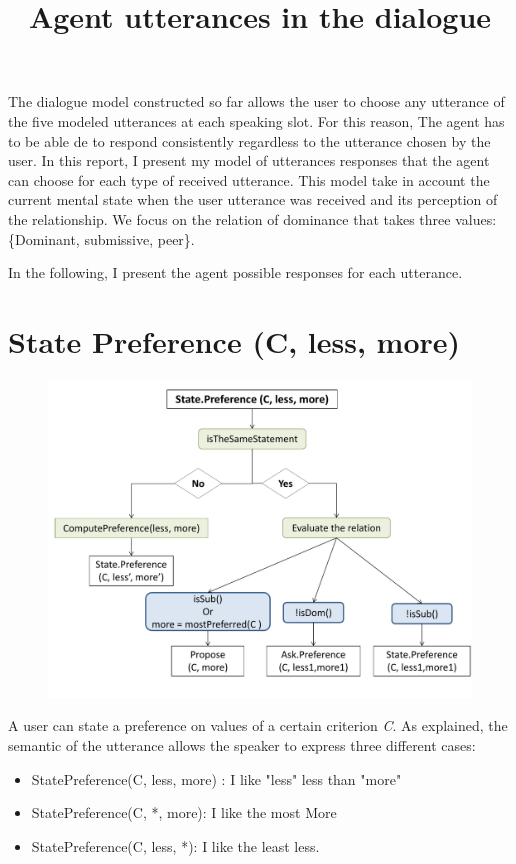 \documentclass{llncs}
\begin{document}
\title{Agent utterances in the dialogue}
\maketitle 

The dialogue model constructed so far allows the user to choose any utterance of the five modeled utterances at each speaking slot. For this reason, The agent has to be able de to respond consistently regardless to the utterance chosen by the user. In this report, I present my model of utterances responses that the agent can choose for each type of received utterance. This model take in account the current mental state when the user utterance was received and its perception of the relationship. We focus on the relation of dominance that takes three values: \{Dominant, submissive, peer\}.

\par In the following, I present the agent possible responses for each utterance. 
\section{State Preference (C, less, more)}
\begin{figure}[b]
	\centerline{\includegraphics[width=5in]{utterances/StatePref.pdf}}
	\vskip 8pt
\end{figure}

	\par A user can state a preference on values of a certain criterion \emph{C}. As explained, the semantic of the utterance allows the speaker to express three different cases:
	\begin{itemize}
		\item StatePreference(C, less, more) : I like "less" less than "more"
		\item StatePreference(C, *, more): I like the most More
		\item StatePreference(C, less, *): I like the least less. 
	\end{itemize}
	
\end{document}
